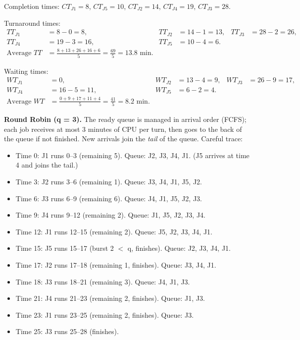 \documentclass[11pt]{article}
\begin{document}
Completion times: $CT_{J1}=8$, $CT_{J5}=10$, $CT_{J2}=14$, $CT_{J4}=19$, $CT_{J3}=28$.

Turnaround times:
\begin{align*}
TT_{J1} &= 8 - 0 = 8, & TT_{J2} &= 14 - 1 = 13, & TT_{J3} &= 28 - 2 = 26, \\
TT_{J4} &= 19 - 3 = 16, & TT_{J5} &= 10 - 4 = 6. \\
\text{Average } TT &= \frac{8+13+26+16+6}{5} = \frac{69}{5} = 13.8 \text{ min}.
\end{align*}

Waiting times:
\begin{align*}
WT_{J1} &= 0, & WT_{J2} &= 13 - 4 = 9, & WT_{J3} &= 26 - 9 = 17, \\
WT_{J4} &= 16 - 5 = 11, & WT_{J5} &= 6 - 2 = 4. \\
\text{Average } WT &= \frac{0+9+17+11+4}{5} = \frac{41}{5} = 8.2 \text{ min}.
\end{align*}

\textbf{Round Robin (q = 3).} The ready queue is managed in arrival order (FCFS); each job receives at most 3 minutes of CPU per turn, then goes to the back of the queue if not finished. New arrivals join the \emph{tail} of the queue. Careful trace:
\begin{itemize}
    \item Time 0: J1 runs 0--3 (remaining 5). Queue: J2, J3, J4, J1. (J5 arrives at time 4 and joins the tail.)
    \item Time 3: J2 runs 3--6 (remaining 1). Queue: J3, J4, J1, J5, J2.
    \item Time 6: J3 runs 6--9 (remaining 6). Queue: J4, J1, J5, J2, J3.
    \item Time 9: J4 runs 9--12 (remaining 2). Queue: J1, J5, J2, J3, J4.
    \item Time 12: J1 runs 12--15 (remaining 2). Queue: J5, J2, J3, J4, J1.
    \item Time 15: J5 runs 15--17 (burst 2 $<$ q, finishes). Queue: J2, J3, J4, J1.
    \item Time 17: J2 runs 17--18 (remaining 1, finishes). Queue: J3, J4, J1.
    \item Time 18: J3 runs 18--21 (remaining 3). Queue: J4, J1, J3.
    \item Time 21: J4 runs 21--23 (remaining 2, finishes). Queue: J1, J3.
    \item Time 23: J1 runs 23--25 (remaining 2, finishes). Queue: J3.
    \item Time 25: J3 runs 25--28 (finishes).
\end{itemize}
\end{document}
